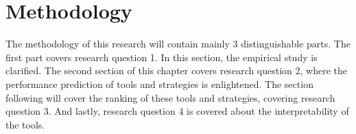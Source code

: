 \chapter{Methodology}
\label{chap:methodology}
The methodology of this research will contain mainly 3 distinguishable parts. The first part covers research question 1. In this section, the empirical study is clarified. The second section of this chapter covers research question 2, where the performance prediction of tools and strategies is enlightened. The section following will cover the ranking of these tools and strategies, covering research question 3. And lastly, research question 4 is covered about the interpretability of the tools.




